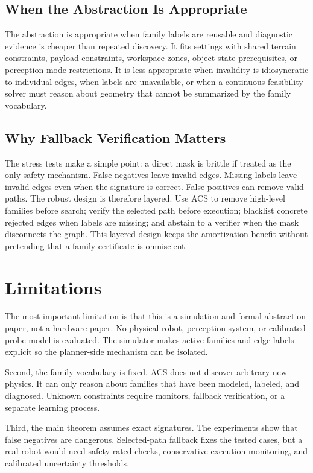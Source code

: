 \documentclass{article}
\newcommand{\ACS}{\textsc{ACS}}
\begin{document}
\subsection{When the Abstraction Is Appropriate}

The abstraction is appropriate when family labels are reusable and diagnostic evidence is cheaper than repeated discovery. It fits settings with shared terrain constraints, payload constraints, workspace zones, object-state prerequisites, or perception-mode restrictions. It is less appropriate when invalidity is idiosyncratic to individual edges, when labels are unavailable, or when a continuous feasibility solver must reason about geometry that cannot be summarized by the family vocabulary.

\subsection{Why Fallback Verification Matters}

The stress tests make a simple point: a direct mask is brittle if treated as the only safety mechanism. False negatives leave invalid edges. Missing labels leave invalid edges even when the signature is correct. False positives can remove valid paths. The robust design is therefore layered. Use \ACS{} to remove high-level families before search; verify the selected path before execution; blacklist concrete rejected edges when labels are missing; and abstain to a verifier when the mask disconnects the graph. This layered design keeps the amortization benefit without pretending that a family certificate is omniscient.

\section{Limitations}

The most important limitation is that this is a simulation and formal-abstraction paper, not a hardware paper. No physical robot, perception system, or calibrated probe model is evaluated. The simulator makes active families and edge labels explicit so the planner-side mechanism can be isolated.

Second, the family vocabulary is fixed. \ACS{} does not discover arbitrary new physics. It can only reason about families that have been modeled, labeled, and diagnosed. Unknown constraints require monitors, fallback verification, or a separate learning process.

Third, the main theorem assumes exact signatures. The experiments show that false negatives are dangerous. Selected-path fallback fixes the tested cases, but a real robot would need safety-rated checks, conservative execution monitoring, and calibrated uncertainty thresholds.
\end{document}
